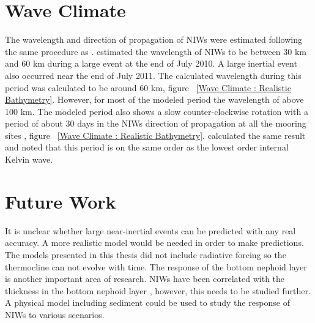 


\section{Wave Climate}

The wavelength and direction of propagation of NIWs were estimated following the same procedure as \citet{austin_2013}. \citet{austin_2013} estimated the
wavelength of NIWs to be between 30 km and 60 km during a large event at the end of July 2010.  A large inertial event also occurred near the end of July 2011. The calculated
wavelength during this period was calculated to be around 60 km, figure ~\ref{Wave Climate : Realistic Bathymetry}. 
However, for most of the modeled period the wavelength of above 100 km. The modeled period also shows a slow
counter-clockwise rotation with a period of about 30 days in the NIWs direction of propagation at all the mooring sites , figure ~\ref{Wave Climate : Realistic Bathymetry}. 
 \citet{austin_2013}  calculated the same result and noted that this period is on the same order as the lowest order internal Kelvin wave. 

\section{Future Work}
It is unclear whether large near-inertial events can be predicted with any real accuracy. A more realistic model would be needed in order to make predictions. 
The models presented in this thesis did not include radiative forcing so the thermocline can not evolve with time. The response of the
bottom nephoid layer is another important area of research. NIWs have been correlated with the thickness in the bottom nephoid layer \citep{hawley_2004}, however, this 
needs to be studied further. A physical model including sediment could be used to study the response of NIWs to various scenarios. 


